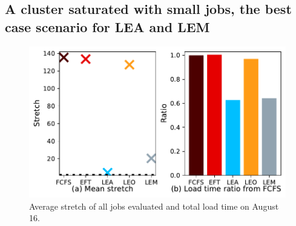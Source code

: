 \documentclass[conference,10pt]{IEEEtran}
\begin{document}
\subsection{A cluster saturated with small jobs, the best case scenario for LEA and LEM}\label{sec.08-16}

\begin{figure}[t]\centering\includegraphics[width=0.9\linewidth]{../MBSS/plot/Results_FCFS_Score_Backfill_2022-08-16->2022-08-16_V10000_Mean_Stretch_Total_waiting_for_a_load_time_and_transfer_time_450_128_32_256_4_1024.pdf}\caption{Average stretch of all jobs evaluated and total load time on August 16.}\label{stretch.08-16}\end{figure}
\end{document}

